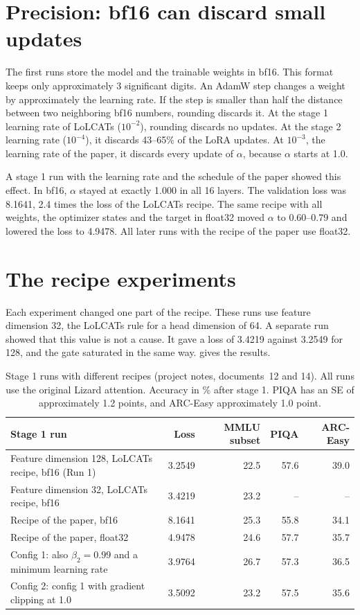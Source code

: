 \section{Precision: bf16 can discard small updates}
\label{sec:precision}

The first runs store the model and the trainable weights in bf16. This format keeps only approximately 3 significant digits. An AdamW step changes a weight by approximately the learning rate. If the step is smaller than half the distance between two neighboring bf16 numbers, rounding discards it. At the stage 1 learning rate of LoLCATs ($10^{-2}$), rounding discards no updates. At the stage 2 learning rate ($10^{-4}$), it discards 43--65\% of the LoRA updates. At $10^{-3}$, the learning rate of the paper, it discards every update of $\alpha$, because $\alpha$ starts at 1.0.

A stage 1 run with the learning rate and the schedule of the paper showed this effect. In bf16, $\alpha$ stayed at exactly 1.000 in all 16 layers. The validation loss was 8.1641, 2.4 times the loss of the LoLCATs recipe. The same recipe with all weights, the optimizer states and the target in float32 moved $\alpha$ to 0.60--0.79 and lowered the loss to 4.9478. All later runs with the recipe of the paper use float32.

\section{The recipe experiments}
\label{sec:recipe-exp}

Each experiment changed one part of the recipe. These runs use feature dimension 32, the LoLCATs rule for a head dimension of 64. A separate run showed that this value is not a cause. It gave a loss of 3.4219 against 3.2549 for 128, and the gate saturated in the same way.  gives the results.

\begin{table}[ht]
\centering
\small
\caption[Stage 1 runs with different recipes]{Stage 1 runs with different recipes (project notes, documents~12 and 14). All runs use the original Lizard attention. Accuracy in \% after stage 1. PIQA has an SE of approximately 1.2 points, and ARC-Easy approximately 1.0 point.}
\label{tab:recipe-runs}
\begin{tabularx}{\linewidth}{@{}Lrrrr@{}}
\toprule
Stage 1 run & Loss & MMLU subset & PIQA & ARC-Easy \\
\midrule
Feature dimension 128, LoLCATs recipe, bf16 (Run 1) & 3.2549 & 22.5 & 57.6 & 39.0 \\
Feature dimension 32, LoLCATs recipe, bf16 & 3.4219 & 23.2 & -- & -- \\
Recipe of the paper, bf16 & 8.1641 & 25.3 & 55.8 & 34.1 \\
Recipe of the paper, float32 & 4.9478 & 24.6 & 57.7 & 35.7 \\
Config 1: also $\beta_2 = 0.99$ and a minimum learning rate & 3.9764 & 26.7 & 57.3 & 36.5 \\
Config 2: config 1 with gradient clipping at 1.0 & 3.5092 & 23.2 & 57.5 & 35.6 \\
\bottomrule
\end{tabularx}
\end{table}

